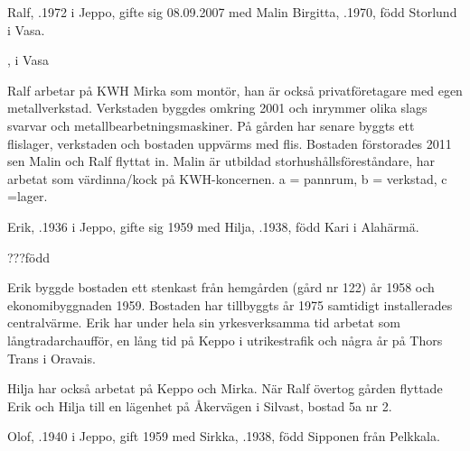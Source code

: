 


Ralf, .1972 i Jeppo, gifte sig 08.09.2007 med Malin Birgitta, .1970, född Storlund i Vasa.
\begin{jhchildren}
  \item {}, i Vasa
  \item {}
  \item {}
\end{jhchildren}

Ralf arbetar på KWH Mirka som montör, han är också privatföretagare med egen metallverkstad. Verkstaden byggdes omkring 2001 och inrymmer olika slags svarvar och metallbearbetningsmaskiner. På gården har senare byggts ett flislager, verkstaden och bostaden uppvärms med flis. Bostaden förstorades 2011 sen Malin och Ralf flyttat in. Malin är utbildad storhushållsföreståndare, har	arbetat som värdinna/kock på KWH-koncernen. a = pannrum, b = verkstad, c =lager.


Erik, .1936 i Jeppo, gifte sig 1959 med Hilja, .1938, född Kari i Alahärmä.
\begin{jhchildren}
  \item {}
  \item {} ???född
\end{jhchildren}
Erik byggde bostaden ett stenkast från hemgården (gård nr 122) år	1958 och ekonomibyggnaden 1959. Bostaden har tillbyggts år 1975 samtidigt installerades centralvärme. Erik har under hela sin yrkesverksamma tid arbetat som långtradarchaufför, en lång tid på Keppo i utrikestrafik och några år på Thors Trans i  Oravais.

Hilja har också arbetat på Keppo och Mirka. När Ralf övertog gården flyttade Erik och Hilja till en lägenhet på Åkervägen i Silvast, bostad 5a nr 2.






Olof, .1940 i Jeppo, gift 1959 med Sirkka, .1938, född Sipponen från Pelkkala.
\begin{jhchildren}
  \item {}
  \item {}
  \item {}
\end{jhchildren}

